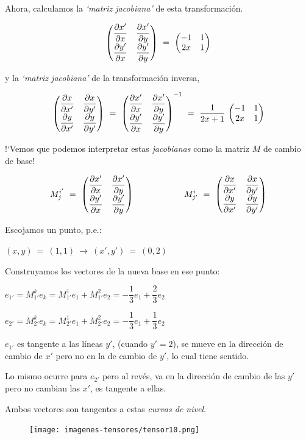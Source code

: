 Ahora, calculamos la \emph{`matriz jacobiana'} de esta transformación.

$$ \mqty( \displaystyle \pdv{x'}{x} & \displaystyle \pdv{x'}{y} \\ \displaystyle \pdv{y'}{x} & \displaystyle \pdv{y'}{y} ) \ = \  \mqty(-1&1\\2x&1)$$

y la \emph{`matriz jacobiana'} de la transformación inversa,

$$ \mqty( \displaystyle \pdv{x}{x'} & \displaystyle \pdv{x}{y'} \\ \displaystyle \pdv{y}{x'} & \displaystyle \pdv{y}{y'} )\ = \ \mqty( \displaystyle \pdv{x'}{x} & \displaystyle \pdv{x'}{y} \\ \displaystyle \pdv{y'}{x} & \displaystyle \pdv{y'}{y} )^{-1} \ = \  \dfrac{1}{2x+1} \ \mqty(-1&1\\2x&1)$$

!`Vemos que podemos interpretar estas \emph{jacobianas} como la matriz $M$ de cambio de base!

$$M^{i'}_{j} \ = \   \mqty( \displaystyle \pdv{x'}{x} & \displaystyle \pdv{x'}{y} \\ \displaystyle \pdv{y'}{x} & \displaystyle \pdv{y'}{y} )
\qquad \qquad \qquad
M^{i}_{j'} \ = \ \mqty( \displaystyle \pdv{x}{x'} & \displaystyle \pdv{x}{y'} \\ \displaystyle \pdv{y}{x'} & \displaystyle \pdv{y}{y'} ) $$

\begin{multicols}{2}
Escojamos un punto, p.e.: 

$(x,y)\ = \ (1,1) \ \to \ (x',y')\ = \ (0,2)$

Construyamos los vectores de la nueva base en ese punto:

$e_{1'}=M_{1'}^ke_k=M_{1'}^1e_1+M_{1'}^2e_2=-\dfrac 1 3 e_1+\dfrac 2 3 e_2$

$e_{2'}=M_{2'}^ke_k=M_{2'}^1e_1+M_{2'}^2e_2=-\dfrac 1 3 e_1+\dfrac 1 3 e_2$  

$e_{1'}$ es tangente a las líneas $y'$, (cuando $y'=2$), se mueve en la dirección de cambio de $x'$ pero no en la de cambio de $y'$, lo cual tiene sentido.

Lo mismo ocurre para $e_{2'}$ pero al revés, va en la dirección de cambio de las $y'$ pero no cambian las $x'$, es tangente a ellas.

Ambos vectores son tangentes a estas \emph{curvas de nivel}.

\begin{figure}[H]
		\centering
		\texttt{[image: imagenes-tensores/tensor10.png]}
	\end{figure}	
\end{multicols}

